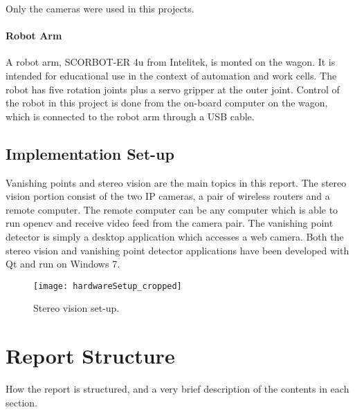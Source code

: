 Only the cameras were used in this projects. 

\paragraph{Robot Arm}

A robot arm, SCORBOT-ER 4u from Intelitek, is monted on the wagon. It is intended for educational use in the context of automation and work cells. The robot has five rotation joints plus a servo gripper at the outer joint. Control of the robot in this project is done from the on-board computer on the wagon, which is connected to the robot arm through a USB cable. 


\subsection{Implementation Set-up}

Vanishing points and stereo vision are the main topics in this report. The stereo vision portion consist of the two IP cameras, a pair of wireless routers and a remote computer. The remote computer can be any computer which is able to run \gls{opencv} and receive video feed from the camera pair. The vanishing point detector is simply a desktop application which accesses a web camera. Both the stereo vision and vanishing point detector applications have been developed with Qt and run on Windows 7.

\begin{figure}
	\texttt{[image: hardwareSetup\_cropped]}
	\caption{\label{fig:hardware}Stereo vision set-up.}
\end{figure}

\section{Report Structure}
How the report is structured, and a very brief description of the contents in each section.